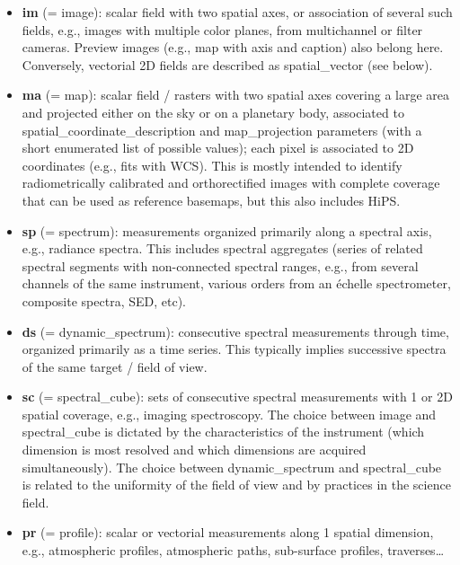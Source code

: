 \documentclass[11pt,a4paper]{ivoa}
\begin{document}
\begin{itemize}

\item \textbf{im }(= image): scalar field with two spatial axes, or
association of several such fields, e.g., images with multiple color
planes, from multichannel or filter cameras. Preview images (e.g., map
with axis and caption) also belong here. Conversely, vectorial 2D fields
are described as spatial\_vector (see below).

\item \textbf{ma }(= map): scalar field / rasters with two spatial axes
covering a large area and projected either on the sky or on a planetary
body, associated to spatial\_coordinate\_description and map\_projection
parameters (with a short enumerated list of possible values); each pixel
is associated to 2D coordinates (e.g., fits with WCS). This is mostly
intended to identify radiometrically calibrated and orthorectified
images with complete coverage that can be used as reference basemaps,
but this also includes HiPS.

\item \textbf{sp }(= spectrum): measurements organized primarily along a
spectral axis, e.g., radiance spectra. This includes spectral aggregates
(series of related spectral segments with non-connected spectral ranges,
e.g., from several channels of the same instrument, various orders from
an échelle spectrometer, composite spectra, SED, etc).

\item \textbf{ds }(= dynamic\_spectrum): consecutive spectral measurements
through time, organized primarily as a time series. This typically
implies successive spectra of the same target / field of view.

\item \textbf{sc }(= spectral\_cube): sets of consecutive
spectral measurements with 1 or 2D spatial coverage, e.g., imaging
spectroscopy. The choice between image and spectral\_cube is dictated by
the characteristics of the instrument (which dimension is most resolved
and which dimensions are acquired simultaneously). The choice between
dynamic\_spectrum and spectral\_cube is related to the uniformity of
the field of view and by practices in the science field.

\item \textbf{pr }(= profile): scalar or vectorial measurements along
1 spatial dimension, e.g., atmospheric profiles, atmospheric paths,
sub-surface profiles, traverses…


\end{itemize}
\end{document}
